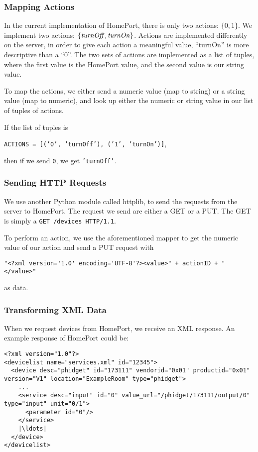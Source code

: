 \subsubsection{Mapping Actions}
In the current implementation of HomePort, 
there is only two actions: $\{0, 1\}$.
We implement two actions: $\{\var{turnOff}, \var{turnOn}\}$. 
Actions are implemented differently on the server, 
in order to give each action a meaningful value, 
\eg ``turnOn'' is more descriptive than a ``0''.
The two sets of actions are implemented as a list of tuples, 
where the first value is the HomePort value, 
and the second value is our string value. 

To map the actions, we either send a numeric value (map to string) or a string value (map to numeric), 
and look up either the numeric or string value in our list of tuples of actions.

If the list of tuples is
\begin{center}
  \texttt{ACTIONS = [('0', 'turnOff'), ('1', 'turnOn')]},
\end{center}
then if we send \texttt{0}, we get \texttt{'turnOff'}. 

\subsubsection{Sending HTTP Requests}
We use another Python module called httplib, 
to send the requests from the server to HomePort. 
The request we send are either a GET or a PUT. 
The GET is simply a \texttt{GET /devices HTTP/1.1}. 

To perform an action, we use the aforementioned mapper to get the numeric value of our action and send a PUT request with 
\begin{verbatim}
"<?xml version='1.0' encoding='UTF-8'?><value>" + actionID + "</value>"
\end{verbatim}
as data. 

\subsubsection{Transforming XML Data}
When we request devices from HomePort, 
we receive an XML response. 
An example response of HomePort could be:
\begin{verbatim}
<?xml version="1.0"?>
<devicelist name="services.xml" id="12345">
  <device desc="phidget" id="173111" vendorid="0x01" productid="0x01" version="V1" location="ExampleRoom" type="phidget">
    ...
    <service desc="input" id="0" value_url="/phidget/173111/output/0" type="input" unit="0/1">
      <parameter id="0"/>
    </service>
    |\ldots|
  </device>
</devicelist>
\end{verbatim}

